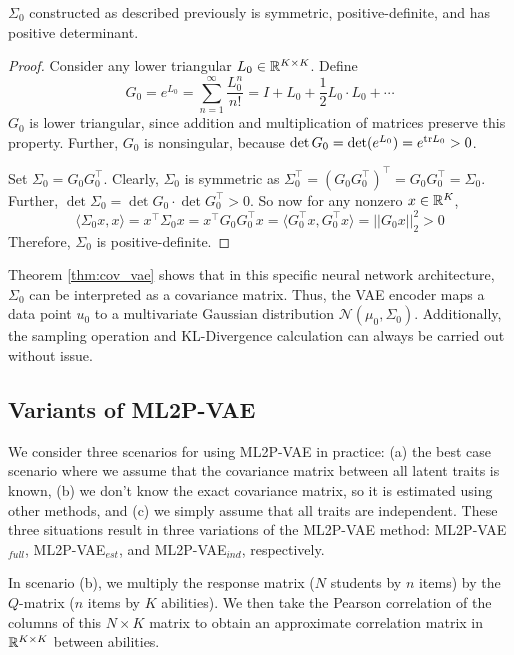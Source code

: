 \begin{theorem}
  $\Sigma_0$ constructed as described previously is symmetric, positive-definite, and has positive determinant.
  \label{thm:cov_vae}
\end{theorem}
\begin{proof}
  Consider any lower triangular $L_0 \in \mathbb{R}^{K\times K}$. Define 
  \[G_0 = e^{L_0} = \sum_{n=1}^\infty \frac{L_0^n}{n!} = I + L_0 + \frac{1}{2} L_0 \cdot L_0 + \cdots\]
  $G_0$ is lower triangular, since addition and multiplication of matrices preserve this property. Further, $G_0$ is nonsingular, because $\det G_0 = \det(e^{L_0}) = e^{\text{tr} L_0} > 0$.

  Set $\Sigma_0 = G_0 G_0^\top$. Clearly, $\Sigma_0$ is symmetric as $\Sigma_0^\top = (G_0 G_0^\top)^\top = G_0 G_0^\top = \Sigma_0$. Further, $\det \Sigma_0 = \det G_0 \cdot \det G_0^\top > 0$. So now for any nonzero $x \in \mathbb{R}^K$,
  \[\langle \Sigma_0 x, x \rangle = x^\top \Sigma_0 x = x^\top G_0 G_0^\top x = \langle G_0^\top x, G_0^\top x \rangle = ||G_0 x||_2^2 > 0\]
  Therefore, $\Sigma_0$ is positive-definite.
\end{proof}

Theorem \ref{thm:cov_vae} shows that in this specific neural network architecture, $\Sigma_0$ can be interpreted as a covariance matrix. Thus, the VAE encoder maps a data point $u_0$ to a multivariate Gaussian distribution $\mathcal{N}(\mu_0, \Sigma_0)$. Additionally, the sampling operation and KL-Divergence calculation can always be carried out without issue. 


\subsection{Variants of ML2P-VAE}\label{sec:variants}

We consider three scenarios for using ML2P-VAE in practice: (a) the best case scenario where we assume that the covariance matrix between all latent traits is known, (b) we don't know the exact covariance matrix, so it is estimated using other methods, and (c) we simply assume that all traits are independent. These three situations result in three variations of the ML2P-VAE method: ML2P-VAE$_{full}$, ML2P-VAE$_{est}$, and ML2P-VAE$_{ind}$, respectively. 

In scenario (b), we multiply the response matrix ($N$ students by $n$ items) by the $Q$-matrix ($n$ items by $K$ abilities). We then take the Pearson correlation of the columns of this $N\times K$ matrix to obtain an approximate correlation matrix in $\mathbb{R}^{K\times K}$ between abilities.


